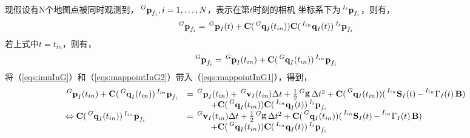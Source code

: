 \documentclass{article}
\begin{document}
\par
现假设有N个地图点被同时观测到，$\sideset{^G}{}{\mathop{\textbf{p}_{f_i}}},i=1,\dots,N$，表示在第$t$时刻的相机
坐标系下为$\sideset{^{I_t}}{}{\mathop{\textbf{p}_{f_i}}}$，则有，
\begin{equation}\label{eqs:mappointInG1}
    \sideset{^G}{}{\mathop{\textbf{p}_{f_i}}}=\sideset{^G}{}{\mathop{\textbf{p}_I}}(t)
    +\textbf{C}(\sideset{^G}{}{\mathop{\textbf{q}_{I}}}(t_{in}))\textbf{C}(\sideset{^{I_{in}}}{}{\mathop{\textbf{q}_{I}}}(t))
    \sideset{^{I_t}}{}{\mathop{\textbf{p}_{f_i}}}
\end{equation}
若上式中$t=t_{in}$，则有，
\begin{equation}\label{eqs:mappointInG2}
    \sideset{^G}{}{\mathop{\textbf{p}_{f_i}}}=\sideset{^G}{}{\mathop{\textbf{p}_I}}(t_{in})
    +\textbf{C}(\sideset{^G}{}{\mathop{\textbf{q}_{I}}}(t_{in}))
    \sideset{^{I_{in}}}{}{\mathop{\textbf{p}_{f_i}}}
\end{equation}
将（\ref{eqs:imuInG}）和（\ref{eqs:mappointInG2}）带入（\ref{eqs:mappointInG1}），得到，
\begin{equation}
    \begin{array}{ll}
        \sideset{^G}{}{\mathop{\textbf{p}_I}}(t_{in})
        +\textbf{C}(\sideset{^G}{}{\mathop{\textbf{q}_{I}}}(t_{in}))
        \sideset{^{I_{in}}}{}{\mathop{\textbf{p}_{f_i}}}
        &=\sideset{^G}{}{\mathop{\textbf{p}_{I}}}(t_{in})+
        \sideset{^G}{}{\mathop{\textbf{v}_{I}}}(t_{in})\Delta{t}
        +\frac{1}{2}\sideset{^G}{}{\mathop{\mathbf{g}}}\Delta{t}^{2}
        +\textbf{C}(\sideset{^G}{}{\mathop{\mathbf{q}_{I}(t_{in})}})
        (\sideset{^{I_{in}}}{}{\mathop{\textbf{S}_{I}(t)}}
        -\sideset{^{I_{in}}}{}{\mathop{{\Gamma}_{I}(t)}}\textbf{B})\\
        &\hspace{1cm}+\textbf{C}(\sideset{^G}{}{\mathop{\textbf{q}_{I}}}(t_{in}))\textbf{C}(\sideset{^{I_{in}}}{}{\mathop{\textbf{q}_{I}}}(t))
        \sideset{^{I_t}}{}{\mathop{\textbf{p}_{f_i}}}\\
        \Leftrightarrow
        \textbf{C}(\sideset{^G}{}{\mathop{\textbf{q}_{I}}}(t_{in}))
        \sideset{^{I_{in}}}{}{\mathop{\textbf{p}_{f_i}}}
        &=\sideset{^G}{}{\mathop{\textbf{v}_{I}}}(t_{in})\Delta{t}
        +\frac{1}{2}\sideset{^G}{}{\mathop{\mathbf{g}}}\Delta{t}^{2}
        +\textbf{C}(\sideset{^G}{}{\mathop{\mathbf{q}_{I}(t_{in})}})
        (\sideset{^{I_{in}}}{}{\mathop{\textbf{S}_{I}(t)}}
        -\sideset{^{I_{in}}}{}{\mathop{{\Gamma}_{I}(t)}}\textbf{B})\\
        &\hspace{1cm}+\textbf{C}(\sideset{^G}{}{\mathop{\textbf{q}_{I}}}(t_{in}))\textbf{C}(\sideset{^{I_{in}}}{}{\mathop{\textbf{q}_{I}}}(t))
        \sideset{^{I_t}}{}{\mathop{\textbf{p}_{f_i}}}
    \end{array}
\end{equation}
\end{document}
